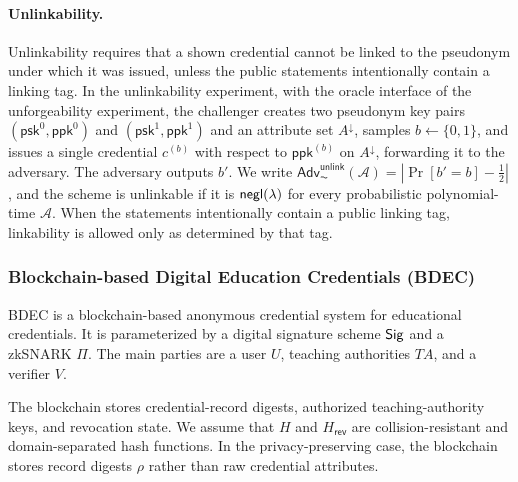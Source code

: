 \paragraph{Unlinkability.}
Unlinkability requires that a shown credential cannot be linked to the pseudonym under which it was issued, unless the public statements intentionally contain a linking tag. In the unlinkability experiment, with the oracle interface of the unforgeability experiment, the challenger creates two pseudonym key pairs \((\mathsf{psk}^0,\mathsf{ppk}^0)\) and \((\mathsf{psk}^1,\mathsf{ppk}^1)\) and an attribute set \(A^\downarrow\), samples \(b\leftarrow\{0,1\}\), and issues a single credential \(c^{(b)}\) with respect to \(\mathsf{ppk}^{(b)}\) on \(A^\downarrow\), forwarding it to the adversary. The adversary outputs \(b'\). We write \(\mathsf{Adv}^{\mathsf{unlink}}_{\AC}(\mathcal A)=\left|\Pr[b'=b]-\tfrac12\right|\), and the scheme is unlinkable if it is \(\mathsf{negl}(\lambda)\) for every probabilistic polynomial-time \(\mathcal A\). When the statements intentionally contain a public linking tag, linkability is allowed only as determined by that tag.

\subsubsection{Blockchain-based Digital Education Credentials (BDEC)}
BDEC is a blockchain-based anonymous credential system for educational credentials. It is parameterized by a digital signature scheme $\mathsf{Sig}$ and a zkSNARK $\Pi$. The main parties are a user $U$, teaching authorities $TA$, and a verifier $V$.

The blockchain stores credential-record digests, authorized teaching-authority keys, and revocation state. We assume that $H$ and $H_{\mathsf{rev}}$ are collision-resistant and domain-separated hash functions. In the privacy-preserving case, the blockchain stores record digests $\rho$ rather than raw credential attributes.

